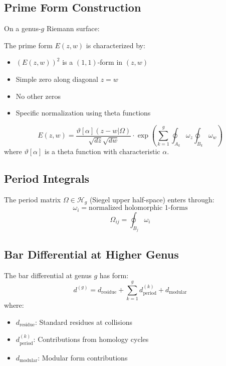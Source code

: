 \subsection{Prime Form Construction}

On a genus-$g$ Riemann surface:

\begin{definition}
The prime form $E(z,w)$ is characterized by:
\begin{itemize}
\item $(E(z,w))^2$ is a $(1,1)$-form in $(z,w)$
\item Simple zero along diagonal $z = w$
\item No other zeros
\item Specific normalization using theta functions
\end{itemize}
\end{definition}

\begin{theorem}
$$E(z,w) = \frac{\vartheta[\alpha](z-w|\Omega)}{\sqrt{dz}\sqrt{dw}} \cdot \exp\left(\sum_{k=1}^{g} \oint_{A_k} \omega_z \oint_{B_k} \omega_w\right)$$
where $\vartheta[\alpha]$ is a theta function with characteristic $\alpha$.
\end{theorem}

\subsection{Period Integrals}

The period matrix $\Omega \in \mathcal{H}_g$ (Siegel upper half-space) enters through:
$$\omega_i = \text{normalized holomorphic 1-forms}$$
$$\Omega_{ij} = \oint_{B_j} \omega_i$$

\subsection{Bar Differential at Higher Genus}

\begin{theorem}
The bar differential at genus $g$ has form:
$$d^{(g)} = d_{\text{residue}} + \sum_{k=1}^g d_{\text{period}}^{(k)} + d_{\text{modular}}$$
where:
\begin{itemize}
\item $d_{\text{residue}}$: Standard residues at collisions
\item $d_{\text{period}}^{(k)}$: Contributions from homology cycles
\item $d_{\text{modular}}$: Modular form contributions
\end{itemize}
\end{theorem}

